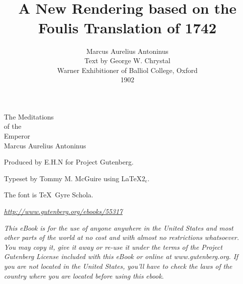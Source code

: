 \documentclass{book}
\title{\simpletitle \\[1em] {\small A New Rendering based on the Foulis Translation of 1742}}
\author{Marcus Aurelius Antoninus \\[2em] Text by George W. Chrystal \\ {\small Warner Exhibitioner of Balliol College, Oxford} \\[2em] 1902}
\date{}
\newcommand\simpletitle{The Meditations \\ of the \\ Emperor \\ Marcus Aurelius Antoninus}
\begin{document}
\setlength{\baselineskip}{1.2\baselineskip}

\frontmatter

\thispagestyle{empty}
\hspace{0pt}
\pagebreak

\thispagestyle{empty}
\hspace{0pt}
\pagebreak

\thispagestyle{empty}
\hspace{0pt}
\pagebreak

\thispagestyle{empty}
\hspace{0pt}
\pagebreak

\thispagestyle{empty}
\hspace{0pt}
\vfill
\begin{center}
  \Large
  \simpletitle
\end{center}
\vfill
\pagebreak

\thispagestyle{empty}
\hspace{0pt}
\vfill

Produced by E.H.N for Project Gutenberg.

Typeset by Tommy M. McGuire using \LaTeX $2_\epsilon$.

The font is \TeX\ Gyre Schola.

\pagebreak
\thispagestyle{empty}

\maketitle

\pagebreak

\hspace{0pt}
\vfill

\emph{\href{http://www.gutenberg.org/ebooks/55317}{http://www.gutenberg.org/ebooks/55317}}

\emph{This eBook is for the use of anyone anywhere in the United States and
most other parts of the world at no cost and with almost no
restrictions whatsoever. You may copy it, give it away or re-use it
under the terms of the Project Gutenberg License included with this
eBook or online at www.gutenberg.org. If you are not located in the
United States, you'll have to check the laws of the country where you
are located before using this ebook.}

\hspace{0pt}

\tableofcontents
\end{document}
